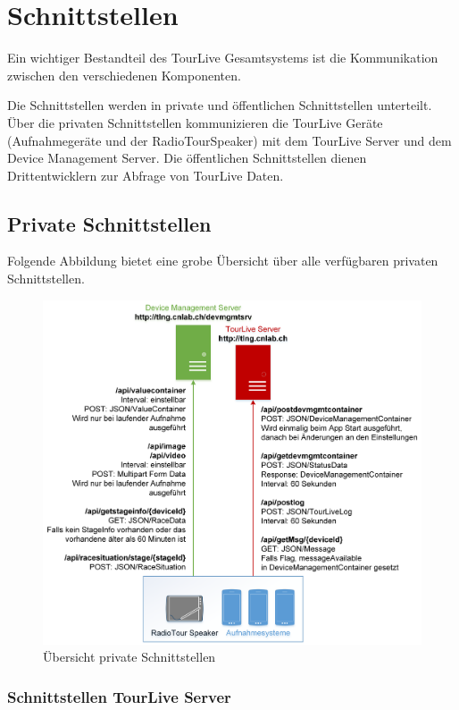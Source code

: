 \chapter{Schnittstellen}

Ein wichtiger Bestandteil des TourLive Gesamtsystems ist die Kommunikation zwischen den verschiedenen Komponenten. 

Die Schnittstellen werden in private und öffentlichen Schnittstellen unterteilt. Über die privaten Schnittstellen kommunizieren die TourLive Geräte (Aufnahmegeräte und der RadioTourSpeaker) mit dem TourLive Server und dem Device Management Server. Die öffentlichen Schnittstellen dienen Drittentwicklern zur Abfrage von TourLive Daten. 

\section{Private Schnittstellen}
Folgende Abbildung bietet eine grobe Übersicht über alle verfügbaren privaten Schnittstellen.
\begin{figure}[H]
	\centering
	\includegraphics[width=130mm]{images/uebersicht_schnittstelle.png}
	\caption{Übersicht private Schnittstellen}
\end{figure}

\subsection{Schnittstellen TourLive Server}
\label{sec:tourliveserverapi}

